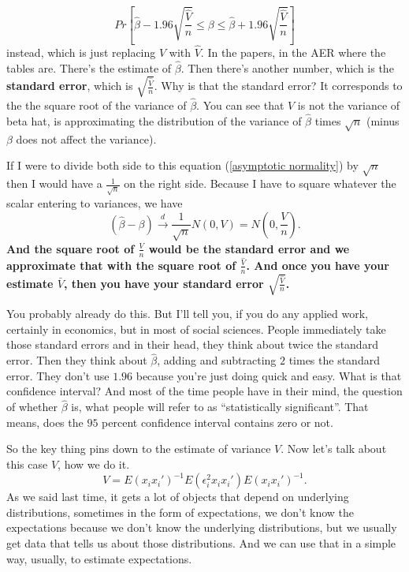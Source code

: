 \documentclass[11pt,a4paper]{amsart}
\theoremstyle{plain}
\theoremstyle{definition}
\begin{document}
		 \[	Pr[ \hat{\beta}-1.96 \sqrt{\frac{\hat{V}}{n}} \leq \beta \leq \hat{\beta} + 1.96 \sqrt{\frac{\hat{V}}{n}}]	\]
		 instead, which is just replacing $V$ with $\hat{V}$. In the papers, in the AER where the tables are. There's the estimate of $\hat{\beta}$. Then there's another number, which is the \textbf{standard error}, which is $\sqrt{\frac{\hat{V}}{n}}$. Why is that the standard error? It corresponds to the the square root of the variance of $\hat{\beta}$. You can see that $V$ is not the variance of beta hat, is approximating the distribution of the variance of $\hat{\beta}$ times $\sqrt{n}$ (minus $\beta$ does not affect the variance).  \par 
		 If I were to divide both side to this equation (\ref{asymptotic normality}) by $\sqrt{n}$ then I would have a $\frac{1}{\sqrt{n}}$ on the right side. Because I have to square whatever the scalar entering to variances, we have 
		 \[	(\hat{\beta} - \beta) \stackrel{d}{\longrightarrow} \frac{1}{\sqrt{n}} N(0,V) = N(0,\frac{V}{n}).	\]
		 \textbf{And the square root of $\frac{V}{n}$ would be the standard error and we approximate that with the square root of $\frac{\hat{V}}{n}$. And once you have your estimate $\bar{V}$, then you have your standard error $\sqrt{\frac{\hat{V}}{n}}$.}\par 
		 You probably already do this. But I'll tell you, if you do any applied work, certainly in economics, but in most of social sciences. People immediately take those standard errors and in their head, they think about twice the standard error. Then they think about $\hat{\beta}$, adding and subtracting $2$ times the standard error. They don't use $1.96$ because you're just doing quick and easy. What is that confidence interval? And most of the time people have in their mind, the question of whether $\hat{\beta}$ is, what people will refer to as ``statistically significant''. That means, does the $95$ percent confidence interval contains zero or not.\par 
		 So the key thing pins down to the estimate of variance $V$. Now let's talk about this case $\hat{V}$, how we do it.
		 \[	V = E(x_{i}x_{i}')^{-1}E(\epsilon_{i}^{2}x_{i}x_{i}')E(x_{i}x_{i}')^{-1}.	\]
		 As we said last time, it gets a lot of objects that depend on underlying distributions, sometimes in the form of expectations, we don't know the expectations because we don't know the underlying distributions, but we usually get data that tells us about those distributions. And we can use that in a simple way, usually, to estimate expectations.\par 
\end{document}

